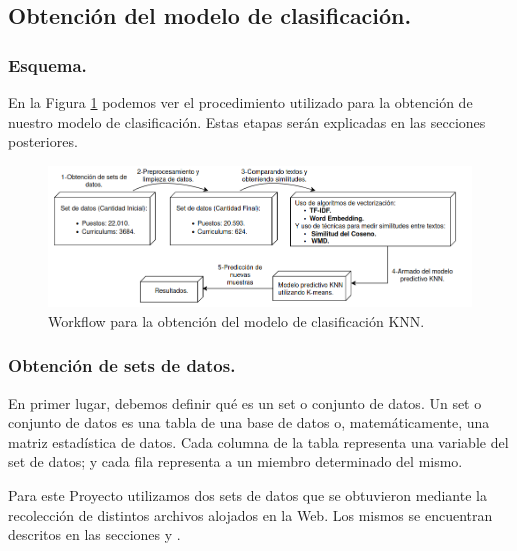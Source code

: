 \documentclass[12pt,a4paper]{article}
\begin{document}
\begin{sloppypar}
\cleardoublepage

\subsection{Obtención del modelo de clasificación.}\label{5.1.Obtenciondelmodelopredictivo}

\subsubsection{Esquema.}

En la Figura \ref{fig:FlowCoreSystem} podemos ver el procedimiento utilizado para la obtención de nuestro modelo de clasificación. Estas etapas serán explicadas en las secciones posteriores. \\

\begin{figure}[H]    %
  \centering
  \includegraphics[width=1\textwidth]{images/flow-core.png} 	%
  \caption{Workflow para la obtención del modelo de clasificación KNN. \\}  
  \label{fig:FlowCoreSystem}
\end{figure}

\subsubsection{Obtención de sets de datos.}\label{obtencion_set_datos}

En primer lugar, debemos definir qué es un set o conjunto de datos.
Un set o conjunto de datos es una tabla de una base de datos o, matemáticamente, una matriz estadística de datos. Cada columna de la tabla representa una variable del set de datos; y cada fila representa a un miembro determinado del mismo.

Para este Proyecto utilizamos dos sets de datos que se obtuvieron mediante la recolección de distintos archivos alojados en la Web. Los mismos se encuentran descritos en las secciones \textit{} y \textit{}.


\end{sloppypar}
\end{document}
